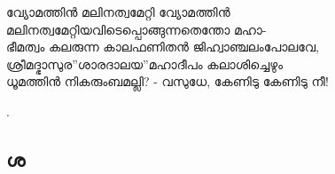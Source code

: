 \begin{enumerate}


\begin{slokam}{\VSv}{\KA}{വ്യോമത്തിൻ മലിനത്വമേറ്റി}
വ്യോമത്തിൻ മലിനത്വമേറ്റിയവിടെപ്പൊങ്ങുന്നതെന്തോ മഹാ-\\
ഭീമത്വം കലരുന്ന കാലഫണിതൻ ജിഹ്വാഞ്ചലം‌പോലവേ,\\
ശ്രീമദ്ഭാസുര”ശാരദാലയ”മഹാദീപം കലാശിച്ചെഴും\\
ധൂമത്തിൻ നികരുംബമല്ലി? - വസുധേ, കേണിടു കേണിടു നീ!
\end{slokam}


.




\end{enumerate}

\subsection{ശ}

